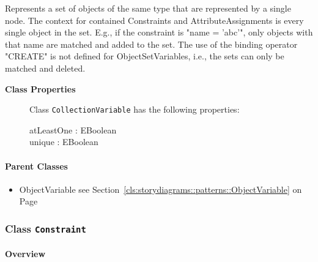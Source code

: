 	
			
Represents a set of objects of the same type that are represented by a single node.
The context for contained Constraints and AttributeAssignments is every single object in the set. E.g., if the constraint is "name = 'abc'", only objects with that name are matched and added to the set. The use of the binding operator "CREATE" is not defined for ObjectSetVariables, i.e., the sets can only be matched and deleted.	
		
	


\begin{description}

	\item[\textbf{Class Properties}] Class \texttt{CollectionVariable} has the following properties:
	\begin{description}
\item[atLeastOne : EBoolean 	]

\hspace{\fill}
\nopagebreak


	
\item[unique : EBoolean 	]

\hspace{\fill}
\nopagebreak


	
	\end{description}
	
	

\end{description}

\paragraph{Parent Classes}
\begin{itemize}
\item ObjectVariable see Section~\ref{cls:storydiagrams::patterns::ObjectVariable} on Page~\pageref{cls:storydiagrams::patterns::ObjectVariable}\end{itemize}
\subsubsection{\Large{Class \bfseries \texttt{Constraint}\normalfont}}
\label{cls:storydiagrams::patterns::Constraint} 
\paragraph{Overview}

